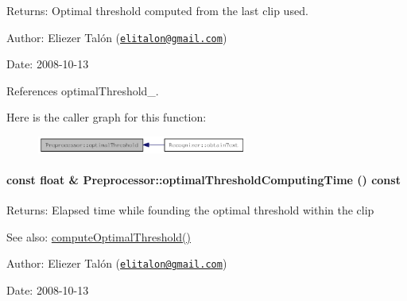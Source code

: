 \begin{Desc}
\item[Returns:]Optimal threshold computed from the last clip used.\end{Desc}
\begin{Desc}
\item[Author:]Eliezer Talón (\href{mailto:elitalon@gmail.com}{\tt elitalon@gmail.com}) \end{Desc}
\begin{Desc}
\item[Date:]2008-10-13 \end{Desc}


References optimalThreshold\_\-.

Here is the caller graph for this function:\nopagebreak
\begin{figure}[H]
\begin{center}
\leavevmode
\includegraphics[width=196pt]{class_preprocessor_a44dff024a5b29752780bd4aa0d53d81_icgraph}
\end{center}
\end{figure}
\hypertarget{class_preprocessor_72aa2eb5f3a7e7ee0d3ca27ddd6bfc5e}{
\paragraph[{optimalThresholdComputingTime}]{\setlength{\rightskip}{0pt plus 5cm}const float \& Preprocessor::optimalThresholdComputingTime () const}\hfill}
\label{class_preprocessor_72aa2eb5f3a7e7ee0d3ca27ddd6bfc5e}


\begin{Desc}
\item[Returns:]Elapsed time while founding the optimal threshold within the clip\end{Desc}
\begin{Desc}
\item[See also:]\hyperlink{class_preprocessor_ac2f414d6f4f917419f33f6067eb8634}{computeOptimalThreshold()}\end{Desc}
\begin{Desc}
\item[Author:]Eliezer Talón (\href{mailto:elitalon@gmail.com}{\tt elitalon@gmail.com}) \end{Desc}
\begin{Desc}
\item[Date:]2008-10-13 \end{Desc}


